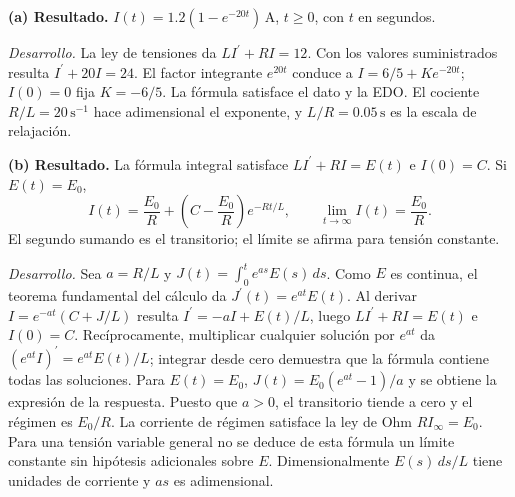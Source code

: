 \noindent\textbf{(a) Resultado.} $I(t)=1.2(1-e^{-20t})\,\mathrm A$, $t\ge0$, con $t$ en segundos.

\noindent\textit{Desarrollo.} La ley de tensiones da $LI^{\prime}+RI=12$. Con los valores suministrados resulta $I^{\prime}+20I=24$. El factor integrante $e^{20t}$ conduce a $I=6/5+Ke^{-20t}$; $I(0)=0$ fija $K=-6/5$. La fórmula satisface el dato y la EDO. El cociente $R/L=20\,\mathrm{s^{-1}}$ hace adimensional el exponente, y $L/R=0.05\,\mathrm s$ es la escala de relajación.

\medskip

\noindent\textbf{(b) Resultado.} La fórmula integral satisface $LI^{\prime}+RI=E(t)$ e $I(0)=C$. Si $E(t)=E_0$, \[I(t)=\frac{E_0}{R}+\left(C-\frac{E_0}{R}\right)e^{-Rt/L},\qquad \lim_{t\to\infty}I(t)=\frac{E_0}{R}.\] El segundo sumando es el transitorio; el límite se afirma para tensión constante.

\noindent\textit{Desarrollo.} Sea $a=R/L$ y $J(t)=\int_0^t e^{as}E(s)\,ds$. Como $E$ es continua, el teorema fundamental del cálculo da $J^{\prime}(t)=e^{at}E(t)$. Al derivar $I=e^{-at}(C+J/L)$ resulta $I^{\prime}=-aI+E(t)/L$, luego $LI^{\prime}+RI=E(t)$ e $I(0)=C$. Recíprocamente, multiplicar cualquier solución por $e^{at}$ da $(e^{at}I)^{\prime}=e^{at}E(t)/L$; integrar desde cero demuestra que la fórmula contiene todas las soluciones. Para $E(t)=E_0$, $J(t)=E_0(e^{at}-1)/a$ y se obtiene la expresión de la respuesta. Puesto que $a>0$, el transitorio tiende a cero y el régimen es $E_0/R$. La corriente de régimen satisface la ley de Ohm $RI_\infty=E_0$. Para una tensión variable general no se deduce de esta fórmula un límite constante sin hipótesis adicionales sobre $E$. Dimensionalmente $E(s)\,ds/L$ tiene unidades de corriente y $as$ es adimensional.
